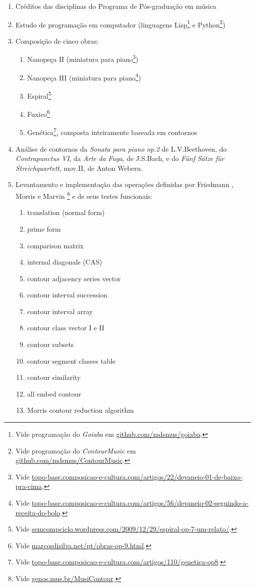 \documentclass[12pt]{article}
\newcommand{\opus}[1]{\textit{#1}}
\begin{document}
\begin{enumerate}
\item Créditos das disciplinas do Programa de Pós-graduação em música
\item Estudo de programação em computador (linguagens
  Lisp\footnote{Vide programação do \textit{Goiaba} em
    \url{github.com/mdsmus/goiaba}.} e Python\footnote{Vide
    programação do \textit{ContourMusic} em
    \url{github.com/mdsmus/ContourMusic}.})
\item Composição de cinco obras:
\begin{enumerate}
\item Nanopeça II (miniatura para piano\footnote{Vide
    \url{topo-base.composicao-e-cultura.com/artigos/22/devaneio-01-de-baixo-pra-cima}.})
\item Nanopeça III (miniatura para piano\footnote{Vide
    \url{topo-base.composicao-e-cultura.com/artigos/56/devaneio-02-seguindo-a-receita-do-bolo}.})
\item Espiral\footnote{Vide
  \url{semcompciclo.wordpress.com/2009/12/29/espiral-op-7-um-relato/}.}
\item Fuxico\footnote{Vide
    \url{marcosdisilva.net/pt/obras-op-9.html}.}
\item Genética\footnote{Vide
    \url{topo-base.composicao-e-cultura.com/artigos/110/genetica-op8}.},
  composta inteiramente baseada em contornos
\end{enumerate}
\item Análise de contornos da \opus{Sonata para piano op.2} de
  L.V.Beethoven, do \opus{Contrapunctus VI}, da \opus{Arte da Fuga},
  de J.S.Bach, e do \opus{Fünf Sätze für Streichquartett}, mov.II, de
  Anton Webern.
\item Levantamento e implementação das operações definidas por
  Friedmann \cite{friedmann85:methodology}, Morris
  \cite{morris93:directions} e Marvin
  \cite{marvin.ea87:relating}\footnote{Vide
    \url{genos.mus.br/MusiContour}.} e de seus testes funcionais:
  \begin{enumerate}
  \item translation (normal form)
  \item prime form
  \item comparison matrix
  \item internal diagonals (CAS)
  \item contour adjacency series vector
  \item contour interval succession
  \item contour interval array
  \item contour class vector I e II
  \item contour subsets
  \item contour segment classes table
  \item contour similarity
  \item all embed contour
  \item Morris contour reduction algorithm
  \end{enumerate}
\end{enumerate}
\end{document}
